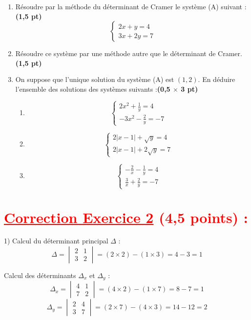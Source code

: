 \documentclass[12pt]{article}
\begin{document}
\begin{enumerate}
    \item Résoudre par la méthode du déterminant de Cramer le système (A) suivant :\textbf{(1,5 pt)}
    \[
    \begin{cases}
    2x + y = 4 \\
    3x + 2y = 7
    \end{cases}
    \]

    \item Résoudre ce système par une méthode autre que le déterminant de Cramer.\textbf{(1,5 pt)}

    \item On suppose que l’unique solution du système (A) est \((1, 2)\). En déduire l’ensemble des solutions des systèmes suivants :\textbf{(0,5 $\times$ 3 pt)}
    \begin{enumerate}
        \item 
        \[
        \begin{cases}
        2x^2 + \frac{1}{y} = 4 \\
        -3x^2 - \frac{2}{y} = -7
        \end{cases}
        \]
        
        \item 
        \[
        \begin{cases}
        2|x - 1| + \sqrt{y} = 4 \\
        2|x - 1| + 2\sqrt{y} = 7
        \end{cases}
        \]
        
        \item 
        \[
        \begin{cases}
        -\frac{2}{x} - \frac{1}{y} = 4 \\
        \frac{3}{x} + \frac{2}{y} = -7
        \end{cases}
        \]
    \end{enumerate}
\end{enumerate}
\section*{\textcolor{red}{\underline{Correction Exercice 2} (4,5 points) :}}
1) Calcul du déterminant principal $\Delta$ :
\[
\Delta = \begin{vmatrix}
2 & 1 \\
3 & 2
\end{vmatrix} = (2 \times 2) - (1 \times 3) = 4 - 3 = 1
\]

Calcul des déterminants $\Delta_x$ et $\Delta_y$ :
\[
\Delta_x = \begin{vmatrix}
4 & 1 \\
7 & 2
\end{vmatrix} = (4 \times 2) - (1 \times 7) = 8 - 7 = 1
\]
\[
\Delta_y = \begin{vmatrix}
2 & 4 \\
3 & 7
\end{vmatrix} = (2 \times 7) - (4 \times 3) = 14 - 12 = 2
\]
\end{document}
